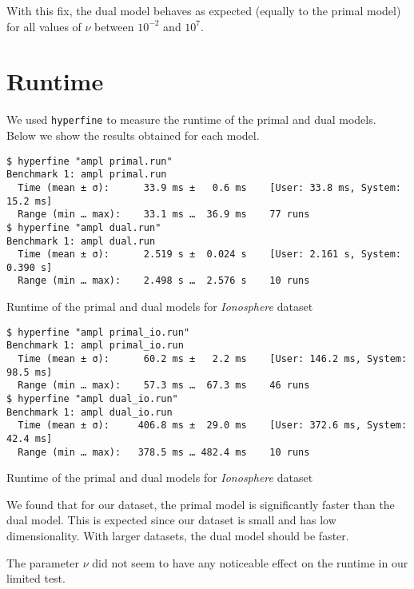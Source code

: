 With this fix, the dual model behaves as expected (equally to the primal model)
for all values of $\nu$ between $10^{-2}$ and $10^{7}$.

\section{Runtime}

We used \texttt{hyperfine}%
\cite{peter_hyperfine_2022}
to measure the runtime of the primal and dual models. Below
we show the results obtained for each model.


\begin{listing}[H]
\begin{verbatim}
$ hyperfine "ampl primal.run"
Benchmark 1: ampl primal.run
  Time (mean ± σ):      33.9 ms ±   0.6 ms    [User: 33.8 ms, System: 15.2 ms]
  Range (min … max):    33.1 ms …  36.9 ms    77 runs
$ hyperfine "ampl dual.run"
Benchmark 1: ampl dual.run
  Time (mean ± σ):      2.519 s ±  0.024 s    [User: 2.161 s, System: 0.390 s]
  Range (min … max):    2.498 s …  2.576 s    10 runs
\end{verbatim}
\caption{Runtime of the primal and dual models for \emph{Ionosphere} dataset}
\end{listing}

\begin{listing}[H]
\begin{verbatim}
$ hyperfine "ampl primal_io.run"
Benchmark 1: ampl primal_io.run
  Time (mean ± σ):      60.2 ms ±   2.2 ms    [User: 146.2 ms, System: 98.5 ms]
  Range (min … max):    57.3 ms …  67.3 ms    46 runs
$ hyperfine "ampl dual_io.run"
Benchmark 1: ampl dual_io.run
  Time (mean ± σ):     406.8 ms ±  29.0 ms    [User: 372.6 ms, System: 42.4 ms]
  Range (min … max):   378.5 ms … 482.4 ms    10 runs
\end{verbatim}
\caption{Runtime of the primal and dual models for \emph{Ionosphere} dataset}
\end{listing}

We found that for our dataset, the primal model is
significantly faster than the dual model. This is expected
since our dataset is small and has low dimensionality.
With larger datasets, the dual model should be faster.

The parameter $\nu$ did not seem to have any noticeable effect on the runtime
in our limited test.
